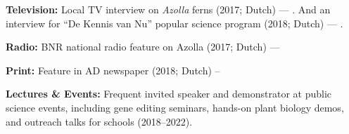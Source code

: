 \documentclass[a4paper,10pt]{article}
\begin{document}
\begin{description}
  \raggedright
  \item \textbf{Television:} Local TV interview on \textit{Azolla} ferns (2017; Dutch) — . 
  And an interview for “De Kennis van Nu” popular science program (2018; Dutch) — .
  \item \textbf{Radio:} BNR national radio feature on Azolla (2017; Dutch) — 
  \item \textbf{Print:} Feature in AD newspaper (2018; Dutch) -- 
  \item \textbf{Lectures \& Events:} Frequent invited speaker and demonstrator at public science events, including gene editing seminars, hands-on plant biology demos, and outreach talks for schools (2018–2022).
\end{description}


\end{document}
